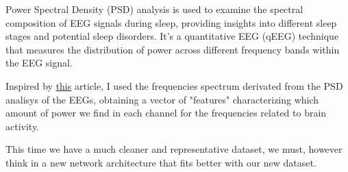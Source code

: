 Power Spectral Density (PSD) analysis is used to examine the spectral composition of EEG signals during sleep, providing insights into different sleep stages and potential sleep disorders. It's a quantitative EEG (qEEG) technique that measures the distribution of power across different frequency bands within the EEG signal.

Inspired by \href{https://mne.tools/stable/auto_tutorials/clinical/60_sleep.html#design-a-scikit-learn-transformer-from-a-python-function}{this} article, I used the frequencies spectrum derivated from the PSD analisys of the EEGs, obtaining a vector of "features" characterizing which amount of power we find in each channel for the frequencies related to brain activity.

This time we have a much cleaner and representative dataset, we must, however think in a new network architecture that fits better with our new dataset.

\blindtext

\blindtext

\blindtext

\blindtext

\blindtext



